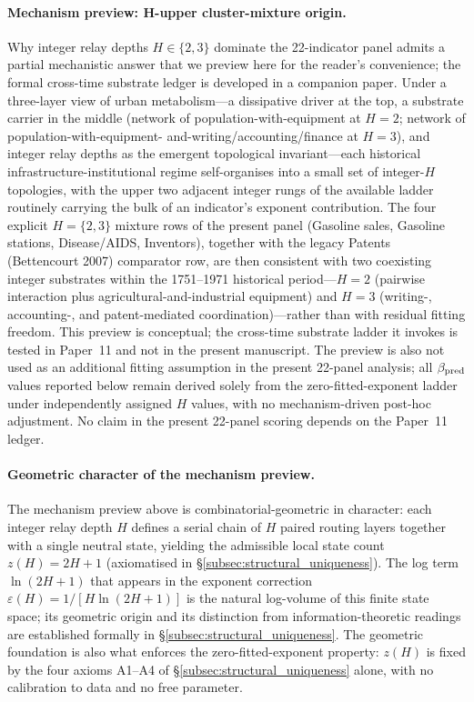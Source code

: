 \paragraph{Mechanism preview: H-upper cluster-mixture origin.}
Why integer relay depths $H{\in}\{2,3\}$ dominate the 22-indicator panel
admits a partial mechanistic answer that we preview here for the reader's
convenience; the formal cross-time substrate ledger is developed in a
companion paper. Under a three-layer view of urban metabolism---a
dissipative driver at the top, a substrate carrier in the middle (network
of population-with-equipment at $H{=}2$; network of population-with-equipment-
and-writing/accounting/finance at $H{=}3$), and integer relay depths as the
emergent topological invariant---each historical infrastructure-institutional
regime self-organises into a small set of integer-$H$ topologies, with the
upper two adjacent integer rungs of the available ladder routinely carrying
the bulk of an indicator's exponent contribution. The four explicit $H{=}\{2,3\}$
mixture rows of the present panel (Gasoline sales, Gasoline stations,
Disease/AIDS, Inventors), together with the legacy Patents (Bettencourt 2007)
comparator row, are then consistent with two coexisting integer substrates
within the 1751--1971 historical period---$H{=}2$ (pairwise interaction plus
agricultural-and-industrial equipment) and $H{=}3$ (writing-, accounting-,
and patent-mediated coordination)---rather than with residual fitting freedom.
This preview is conceptual; the cross-time substrate ladder it invokes is
tested in Paper~11 and not in the present manuscript. The preview is also
not used as an additional fitting assumption in the present 22-panel analysis;
all $\beta_{\rm pred}$ values reported below remain derived solely from the
zero-fitted-exponent ladder under independently assigned $H$ values, with no
mechanism-driven post-hoc adjustment. No claim in the present 22-panel
scoring depends on the Paper~11 ledger.

\paragraph{Geometric character of the mechanism preview.}
The mechanism preview above is combinatorial-geometric in character: each
integer relay depth $H$ defines a serial chain of $H$ paired routing layers
together with a single neutral state, yielding the admissible local state
count $z(H)=2H+1$ (axiomatised in
\S\ref{subsec:structural_uniqueness}).
The log term $\ln(2H+1)$ that appears in the exponent correction
$\varepsilon(H)=1/[H\ln(2H+1)]$ is the natural log-volume of this finite
state space; its geometric origin and its distinction from
information-theoretic readings are established formally in
\S\ref{subsec:structural_uniqueness}.
The geometric foundation is also what enforces the zero-fitted-exponent
property: $z(H)$ is fixed by the four axioms A1--A4 of
\S\ref{subsec:structural_uniqueness} alone, with no calibration to data
and no free parameter.

